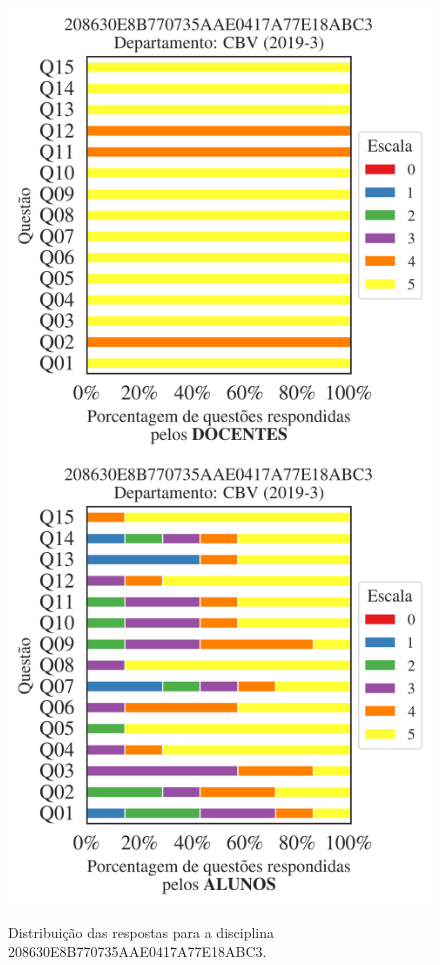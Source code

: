 \documentclass[a4paper,10pt]{article}
\begin{document}
\begin{figure}[h]
\centering
\includegraphics[width=0.485\linewidth]{analise_disciplina_departamento_CBV_208630E8B770735AAE0417A77E18ABC3_docentes.png}
\includegraphics[width=0.485\linewidth]{analise_disciplina_departamento_CBV_208630E8B770735AAE0417A77E18ABC3_alunos.png}
\caption{\label{fig:analise_geral_departamento}                Distribuição das respostas para a disciplina 208630E8B770735AAE0417A77E18ABC3. }
\end{figure}
\end{document}
